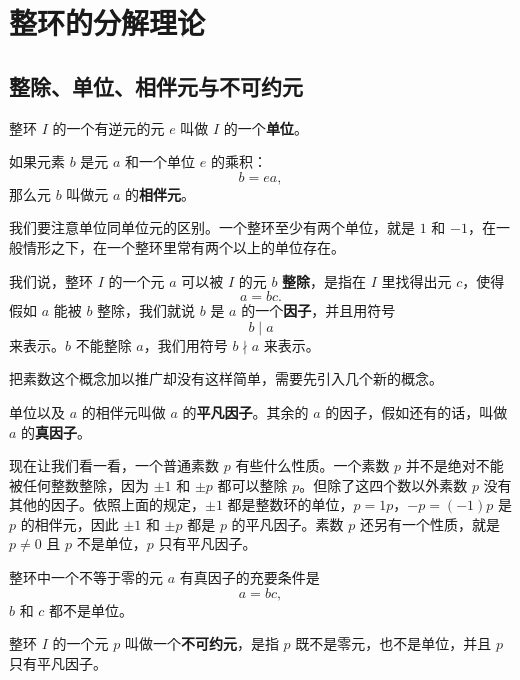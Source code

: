 \chapter{整环的分解理论}

\section{整除、单位、相伴元与不可约元}

\begin{definition}[单位与相伴元]
整环 $I$ 的一个有逆元的元 $e$ 叫做 $I$ 的一个\textbf{单位}。

如果元素 $b$ 是元 $a$ 和一个单位 $e$ 的乘积：
\[
b=ea,
\]
那么元 $b$ 叫做元 $a$ 的\textbf{相伴元}。

我们要注意单位同单位元的区别。一个整环至少有两个单位，就是 $1$ 和 $-1$，在一般情形之下，在一个整环里常有两个以上的单位存在。
\end{definition}

\begin{definition}[整除与因子]
我们说，整环 $I$ 的一个元 $a$ 可以被 $I$ 的元 $b$ \textbf{整除}，是指在 $I$ 里找得出元 $c$，使得
\[
a=bc.
\]
假如 $a$ 能被 $b$ 整除，我们就说 $b$ 是 $a$ 的一个\textbf{因子}，并且用符号
\[
b\mid a
\]
来表示。$b$ 不能整除 $a$，我们用符号 $b\nmid a$ 来表示。

把素数这个概念加以推广却没有这样简单，需要先引入几个新的概念。
\end{definition}

\begin{definition}[平凡因子与真因子]
单位以及 $a$ 的相伴元叫做 $a$ 的\textbf{平凡因子}。其余的 $a$ 的因子，假如还有的话，叫做 $a$ 的\textbf{真因子}。

现在让我们看一看，一个普通素数 $p$ 有些什么性质。一个素数 $p$ 并不是绝对不能被任何整数整除，因为 $\pm1$ 和 $\pm p$ 都可以整除 $p$。但除了这四个数以外素数 $p$ 没有其他的因子。依照上面的规定，$\pm1$ 都是整数环的单位，$p=1p$，$-p=(-1)p$ 是 $p$ 的相伴元，因此 $\pm1$ 和 $\pm p$ 都是 $p$ 的平凡因子。素数 $p$ 还另有一个性质，就是 $p\ne0$ 且 $p$ 不是单位，$p$ 只有平凡因子。
\end{definition}

\begin{theorem}[真因子判别（定理 3）]
整环中一个不等于零的元 $a$ 有真因子的充要条件是
\[
a=bc,
\]
$b$ 和 $c$ 都不是单位。
\end{theorem}

\begin{definition}[不可约元]
整环 $I$ 的一个元 $p$ 叫做一个\textbf{不可约元}，是指 $p$ 既不是零元，也不是单位，并且 $p$ 只有平凡因子。
\end{definition}

